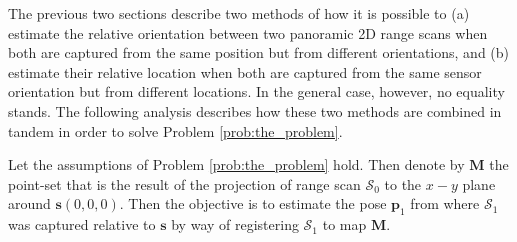 The previous two sections describe two methods of how it is possible to (a)
estimate the relative orientation between two panoramic 2D range scans when
both are captured from the same position but from different orientations, and
(b) estimate their relative location when both are captured from the same
sensor orientation but from different locations. In the general case, however,
no equality stands. The following analysis describes how these two methods are
combined in tandem in order to solve Problem \ref{prob:the_problem}.

Let the assumptions of Problem \ref{prob:the_problem} hold. Then denote by
$\bm{M}$ the point-set that is the result of the projection of range scan
$\mathcal{S}_0$ to the $x-y$ plane around $\bm{s}(0,0,0)$. Then the objective
is to estimate the pose $\bm{p}_1$ from where $\mathcal{S}_1$ was captured
relative to $\bm{s}$ by way of registering $\mathcal{S}_1$ to map $\bm{M}$.


